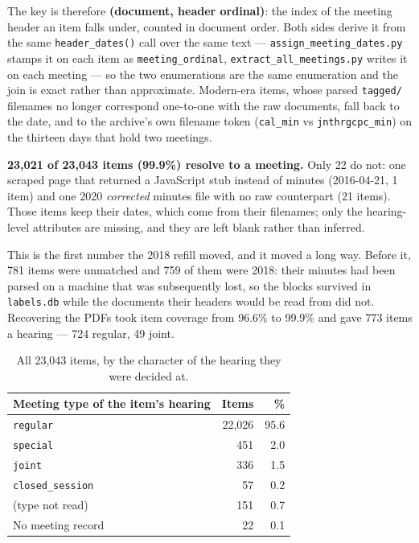 \documentclass[11pt]{article}
\begin{document}
The key is therefore \textbf{(document, header ordinal)}: the index of the meeting header an
item falls under, counted in document order. Both sides derive it from the same
\texttt{header\_dates()} call over the same text --- \texttt{assign\_meeting\_dates.py}
stamps it on each item as \texttt{meeting\_ordinal}, \texttt{extract\_all\_meetings.py}
writes it on each meeting --- so the two enumerations are the same enumeration and the join
is exact rather than approximate. Modern-era items, whose parsed \texttt{tagged/} filenames
no longer correspond one-to-one with the raw documents, fall back to the date, and to the
archive's own filename token (\texttt{cal\_min} vs \texttt{jnthrgcpc\_min}) on the thirteen
days that hold two meetings.

\textbf{23{,}021 of 23{,}043 items (99.9\%) resolve to a meeting.} Only 22 do not: one
scraped page that returned a JavaScript stub instead of minutes (2016-04-21, 1 item) and one
2020 \emph{corrected} minutes file with no raw counterpart (21 items). Those items keep
their dates, which come from their filenames; only the hearing-level attributes are missing,
and they are left blank rather than inferred.

This is the first number the 2018 refill moved, and it moved a long way. Before it, 781
items were unmatched and 759 of them were 2018: their minutes had been parsed on a machine
that was subsequently lost, so the blocks survived in \texttt{labels.db} while the documents
their headers would be read from did not. Recovering the PDFs took item coverage from
96.6\% to 99.9\% and gave 773 items a hearing --- 724 regular, 49 joint.

\begin{table}[h]
\centering
\begin{tabular}{lrr}
\toprule
Meeting type of the item's hearing & Items & \% \\
\midrule
\texttt{regular}        & 22{,}026 & 95.6 \\
\texttt{special}        &     451 &  2.0 \\
\texttt{joint}          &     336 &  1.5 \\
\texttt{closed\_session} &      57 &  0.2 \\
(type not read)         &     151 &  0.7 \\
\midrule
No meeting record       &      22 &  0.1 \\
\bottomrule
\end{tabular}
\caption{All 23{,}043 items, by the character of the hearing they were decided at.}
\end{table}
\end{document}
